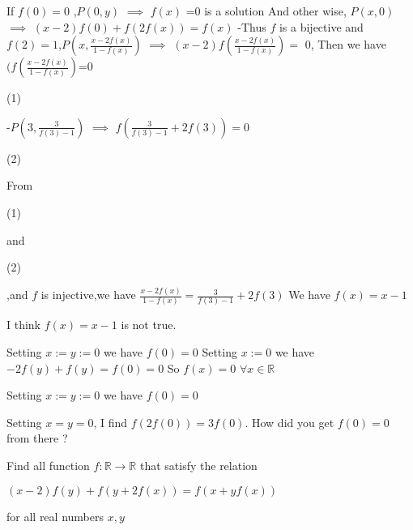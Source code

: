\begin{solution}
	If $f(0)=0$ ,$P(0,y)$ $\implies$ $f(x)$ =0 is a solution
And other wise, $P(x,0)$ $\implies$  $(x-2)f(0)+f(2f(x))=f(x)$
-Thus  $f$  is a bijective and $f(2)=1$,$P(x,\frac{x-2f(x)}{1-f(x)})$ $\implies$ $(x-2)f(\frac{x-2f(x)}{1-f(x)})=$ 0,
Then we have $(f(\frac{x-2f(x)}{1-f(x)})$=0\begin{bolded}  (1)\end{bolded}
-$P(3,\frac{3}{f(3)-1})$  $\implies$  $f(\frac{3}{f(3)-1}+2f(3))=0$ \begin{bolded} (2)\end{bolded}
From \begin{bolded}(1)\end{bolded} and\begin{bolded} (2)\end{bolded},and $f$  is injective,we have  $\frac{x-2f(x)}{1-f(x)}=\frac{3}{f(3)-1}+2f(3)$
We have $f(x)=x-1$
\end{solution}



\begin{solution}
	I think $f(x)=x-1$ is not true.

Setting $x:=y:=0$ we have $f(0)=0$
Setting $x:=0$ we have $-2f(y)+f(y)=f(0)=0$
So $f(x)=0$ $ \forall x \in \mathbb{R}$
\end{solution}



\begin{solution}
	\begin{tcolorbox} Setting $x:=y:=0$ we have $f(0)=0$\end{tcolorbox}
Setting $x=y=0$, I find $f(2f(0))=3f(0)$.
How did you get $f(0)=0$ from there ?
\end{solution}



\begin{solution}
	\begin{tcolorbox}Find all function $f:\mathbb{R}\to\mathbb{R}$ that satisfy the relation

$(x-2)f(y)+f(y+2f(x))=f(x+yf(x))$

for all real numbers $x, y$\end{tcolorbox}
\end{solution}



